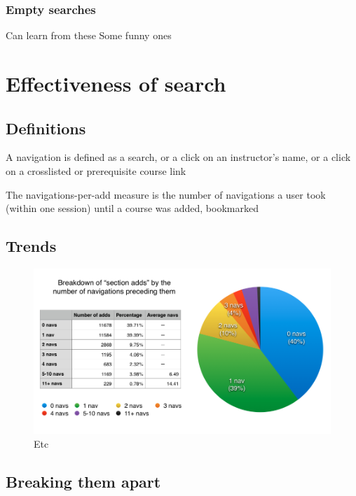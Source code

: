   \subsubsection{Empty searches}

  Can learn from these
  Some funny ones


\section{Effectiveness of search}

\subsection{Definitions}

A navigation is defined as
a search, or
a click on an instructor’s name, or
a click on a crosslisted or prerequisite course link

The navigations-per-add measure is
the number of navigations a user took (within one session) until a course was added, bookmarked

\subsection{Trends}

\begin{figure}
  \centering
  \includegraphics[width=1.0\textwidth]{images/graph/combined_navs}

  \caption{Etc}
  \label{fig:searchtypes}
\end{figure}

\subsection{Breaking them apart}

